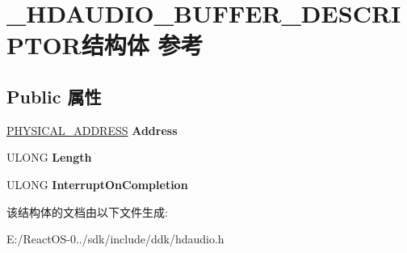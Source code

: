 \hypertarget{struct___h_d_a_u_d_i_o___b_u_f_f_e_r___d_e_s_c_r_i_p_t_o_r}{}\section{\+\_\+\+H\+D\+A\+U\+D\+I\+O\+\_\+\+B\+U\+F\+F\+E\+R\+\_\+\+D\+E\+S\+C\+R\+I\+P\+T\+O\+R结构体 参考}
\label{struct___h_d_a_u_d_i_o___b_u_f_f_e_r___d_e_s_c_r_i_p_t_o_r}
\subsection*{Public 属性}
\begin{DoxyCompactItemize}
\item 
\mbox{\label{struct___h_d_a_u_d_i_o___b_u_f_f_e_r___d_e_s_c_r_i_p_t_o_r_ab13e56075b7fb465a33e1ac2f6bad989}} 
\hyperlink{union___l_a_r_g_e___i_n_t_e_g_e_r}{P\+H\+Y\+S\+I\+C\+A\+L\+\_\+\+A\+D\+D\+R\+E\+SS} {\bfseries Address}
\item 
\mbox{\label{struct___h_d_a_u_d_i_o___b_u_f_f_e_r___d_e_s_c_r_i_p_t_o_r_a6a028e29f6c6160afcf6d32fec97dacf}} 
U\+L\+O\+NG {\bfseries Length}
\item 
\mbox{\label{struct___h_d_a_u_d_i_o___b_u_f_f_e_r___d_e_s_c_r_i_p_t_o_r_af30ec142958d6ee7563ef11216761283}} 
U\+L\+O\+NG {\bfseries Interrupt\+On\+Completion}
\end{DoxyCompactItemize}


该结构体的文档由以下文件生成\+:\begin{DoxyCompactItemize}
\item 
E\+:/\+React\+O\+S-\/0../sdk/include/ddk/hdaudio.\+h\end{DoxyCompactItemize}
